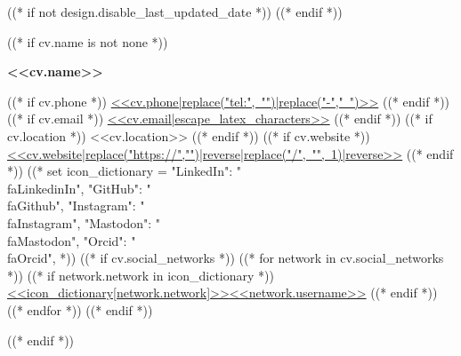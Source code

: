 ((* if not design.disable_last_updated_date *))
\placelastupdatedtext
((* endif *))

((* if cv.name is not none *))
{
    \centering
    \textbf{\fontsize{<<design.header_font_size>>}{<<design.header_font_size>>}\selectfont
        <<cv.name>>
    } \\ \vspace{3pt}
    \small

    \vspace{<<design.margins.header.vertical_between_name_and_connections>>}
    
    \begin{spacing}{1.6}
    ((* if cv.phone *))
    \mbox{\href{<<cv.phone|replace("-","")>>}{{\footnotesize\faPhone*}\hspace{4pt}<<cv.phone|replace("tel:", "")|replace("-"," ")>>}}
    \hspace{<<design.margins.header.horizontal_between_connections>>}
    ((* endif *))
    ((* if cv.email *))
    \mbox{\href{mailto:<<cv.email>>}{{\small\faEnvelope[regular]}\hspace{4pt}<<cv.email|escape_latex_characters>>}}
    \hspace{<<design.margins.header.horizontal_between_connections>>}
    ((* endif *))
    ((* if cv.location *))
    \mbox{{\small\faMapMarker*}\hspace{4pt}<<cv.location>>}
    \hspace{<<design.margins.header.horizontal_between_connections>>}
    ((* endif *))
    ((* if cv.website *))
    \mbox{\href{<<cv.website>>}{{\small\faLink}\hspace{4pt}<<cv.website|replace("https://","")|reverse|replace("/", "", 1)|reverse>>}}
    \hspace{<<design.margins.header.horizontal_between_connections>>}
    ((* endif *))
    ((*
        set icon_dictionary = {
            "LinkedIn": "\\faLinkedinIn",
            "GitHub": "\\faGithub",
            "Instagram": "\\faInstagram",
            "Mastodon": "\\faMastodon",
            "Orcid": "\\faOrcid",
        }
    *))
    ((* if cv.social_networks *))
        ((* for network in cv.social_networks *))
            ((* if network.network in icon_dictionary *))
    \mbox{\href{<<network.url>>}{{\small<<icon_dictionary[network.network]>>}\hspace{4pt}<<network.username>>}}
    \hspace*{<<design.margins.header.horizontal_between_connections>>}
            ((* endif *))
        ((* endfor *))
    ((* endif *))
    \end{spacing}
    \par
}

\vspace{<<design.margins.header.bottom>>}
((* endif *))

\let\hrefWithoutArrow\href
\renewcommand{\href}[2]{\hrefWithoutArrow{#1}{\color{primaryColor}\mbox{\ifthenelse{\equal{#2}{}}{}{#2 }\raisebox{.15ex}{\footnotesize \faExternalLink*}}}}